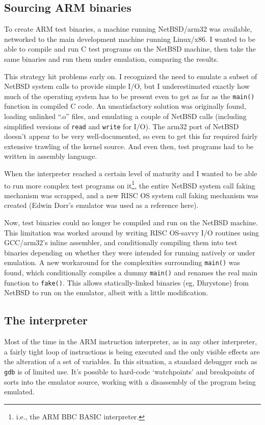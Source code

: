 \subsection{Sourcing ARM binaries}

To create ARM test binaries, a machine running NetBSD/arm32 was available, networked to the main development machine running Linux/x86. I wanted to be able to compile and run C test programs on the NetBSD machine, then take the same binaries and run them under emulation, comparing the results.

This strategy hit problems early on. I recognized the need to emulate a subset of NetBSD system calls to provide simple I/O, but I underestimated exactly how much of the operating system has to be present even to get as far as the {\tt main()} function in compiled C code. An unsatisfactory solution was originally found, loading unlinked ``.o'' files, and emulating a couple of NetBSD calls (including simplified versions of {\tt read} and {\tt write} for I/O). The arm32 port of NetBSD doesn't appear to be very well-documented, so even to get this far required fairly extensive trawling of the kernel source. And even then, test programs had to be written in assembly language.

When the interpreter reached a certain level of maturity and I wanted to be able to run more complex test programs on it\footnote{i.e., the ARM BBC BASIC interpreter.}, the entire NetBSD system call faking mechanism was scrapped, and a new RISC OS system call faking mechanism was created (Edwin Dorr's emulator \cite{Dorr9X} was used as a reference here).

Now, test binaries could no longer be compiled and run on the NetBSD machine. This limitation was worked around by writing RISC OS-savvy I/O routines using GCC/arm32's inline assembler, and conditionally compiling them into test binaries depending on whether they were intended for running natively or under emulation. A new workaround for the complexities surrounding {\tt main()} was found, which conditionally compiles a dummy {\tt main()} and renames the real main function to {\tt fake()}. This allows statically-linked binaries (eg, Dhrystone) from NetBSD to run on the emulator, albeit with a little modification.

\subsection{The interpreter}

Most of the time in the ARM instruction interpreter, as in any other interpreter, a fairly tight loop of instructions is being executed and the only visible effects are the alteration of a set of variables. In this situation, a standard debugger such as {\tt gdb} is of limited use. It's possible to hard-code `watchpoints' and breakpoints of sorts into the emulator source, working with a disassembly of the program being emulated.

